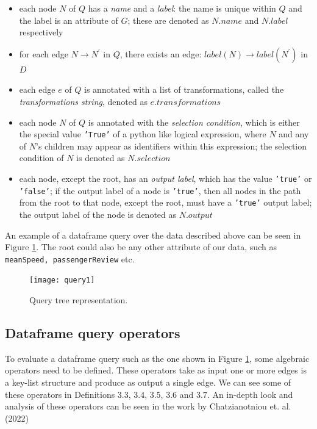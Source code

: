 \begin{itemize}
    \item each node \(N\) of \(Q\) has a \textit{name} and a \textit{label}: the name is unique within \(Q\) and the label is an attribute of \(G\); these are denoted as \(N.name\) and \(N.label\) respectively
    \item for each edge \(N \to N^'\) in \(Q\), there exists an edge: \(label(N) \to label(N^')\) in \(D\)
    \item each edge \(e\) of \(Q\) is annotated with a list of transformations, called the \textit{transformations string}, denoted as \(e.transformations\)
    \item each node \(N\) of \(Q\) is annotated with the \textit{selection condition}, which is either the special value \texttt{'True'} of a python like logical expression, where \(N\) and any of \(N\)'s children may appear as identifiers within this expression; the selection condition of \(N\) is denoted as \(N.selection\)
    \item each node, except the root, has an \textit{output label}, which has the value \texttt{'true'} or \texttt{'false'}; if the output label of a node is \texttt{'true'}, then all nodes in the path from the root to that node, except the root, must have a \texttt{'true'} output label; the output label of the node is denoted as \(N.output\)
\end{itemize}

An example of a dataframe query over the data described above can be seen in Figure \ref{query1}. The root could also be any other attribute of our data, such as \texttt{meanSpeed, passengerReview} etc. 

\begin{center}
    \begin{figure}[h]
        \texttt{[image: query1]}
        \caption{Query tree representation.}
        \label{query1}
    \end{figure}
\end{center}

\subsection{Dataframe query operators}

To evaluate a dataframe query such as the one shown in Figure \ref{query1}, some algebraic operators need to be defined. These operators take as input one or more edges is a key-list structure and produce as output a single edge. We can see some of these operators in Definitions 3.3, 3.4, 3.5, 3.6 and 3.7\cite{chatziantoniou}. An in-depth look and analysis of these operators can be seen in the work by Chatzianotniou et. al. (2022)\cite{chatziantoniou}

